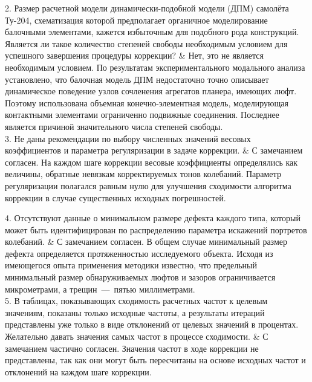 \begin{frame}
	\vspace{0.3em}
	\begin{comtblr}{15em}
		2. Размер расчетной модели динамически-подобной модели (ДПМ) самолёта \mbox{Ту-204}, схематизация которой предполагает органичное моделирование балочными элементами, кажется избыточным для подобного рода конструкций. Является ли такое количество степеней свободы необходимым условием для успешного завершения процедуры коррекции?
		& 
		Нет, это не является необходимым условием. По результатам экспериментального модального анализа установлено, что балочная модель ДПМ недостаточно точно описывает динамическое поведение узлов сочленения агрегатов планера, имеющих люфт. Поэтому использована объемная конечно-элементная модель, моделирующая контактными элементами ограниченно подвижные соединения. Последнее является причиной значительного числа степеней свободы. \\
		3. Не даны рекомендации по выбору численных значений весовых коэффициентов и параметра регуляризации в задаче коррекции.
		&
		С замечанием согласен. На каждом шаге коррекции весовые коэффициенты определялись как величины, обратные невязкам корректируемых тонов колебаний. Параметр регуляризации полагался равным нулю для улучшения сходимости алгоритма коррекции в случае существенных исходных погрешностей. 
	\end{comtblr}
\end{frame}

\begin{frame}
	\vspace{1em}
	\begin{comtblr}{}
		4. Отсутствуют данные о минимальном размере дефекта каждого типа, который может быть идентифицирован по распределению параметра искажений портретов колебаний.
		&
		С замечанием согласен. В общем случае минимальный размер дефекта определяется протяженностью исследуемого объекта. Исходя из имеющегося опыта применения методики известно, что предельный минимальный размер обнаруживаемых люфтов и зазоров ограничивается микрометрами, а трещин~---~пятью миллиметрами. \\
		5. В таблицах, показывающих сходимость расчетных частот к целевым значениям, показаны только исходные частоты, а результаты итераций представлены уже только в виде отклонений от целевых значений в процентах. Желательно давать значения самых частот в процессе сходимости.
		& 
		С замечанием частично согласен. Значения частот в ходе коррекции не представлены, так как они могут быть пересчитаны на основе исходных частот и отклонений на каждом шаге коррекции. 
	\end{comtblr}
\end{frame}

